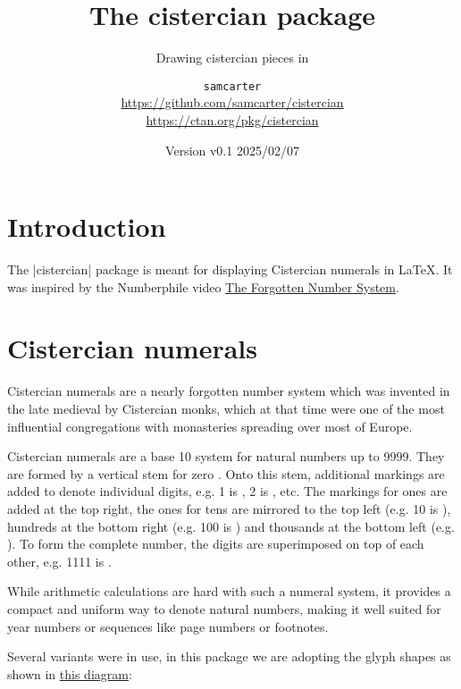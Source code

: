 \documentclass{scrartcl}
\title{The cistercian package}
\subtitle{Drawing cistercian pieces in \TikZ}
\author{%
  \texorpdfstring{
    \texttt{samcarter}\\
    \url{https://github.com/samcarter/cistercian}\\
    \url{https://ctan.org/pkg/cistercian}
  }{samcarter}}
\date{Version v0.1 \textendash{} 2025/02/07}
\begin{document}
\maketitle
\thispagestyle{scrheadings}

\section{Introduction}

The \saminline|cistercian| package is meant for displaying Cistercian numerals in \LaTeX{}.
It was inspired by the Numberphile video \href{https://www.youtube.com/watch?v=9p55Qgt7Ciw}{The Forgotten Number System}. 

\blurb

\section{Cistercian numerals}

Cistercian numerals are a nearly forgotten number system which was invented in the late medieval by Cistercian monks, which at that time were one of the most influential congregations with monasteries spreading over most of Europe.

Cistercian numerals are a base 10 system for natural numbers up to 9999. 
They are formed by a vertical stem for zero .
Onto this stem, additional markings are added to denote individual digits, e.g. 1 is , 2 is , etc. 
The markings for ones are added at the top right, the ones for tens are mirrored to the top left (e.g. 10 is ), hundreds at the bottom right (e.g. 100 is ) and thousands at the bottom left (e.g. ). 
To form the complete number, the digits are superimposed on top of each other, e.g. 1111 is . 

While arithmetic calculations are hard with such a numeral system, it provides a compact and uniform way to denote natural numbers, making it well suited for year numbers or sequences like page numbers or footnotes. 

Several variants were in use, in this package we are adopting the glyph shapes as shown in \href{https://upload.wikimedia.org/wikipedia/commons/6/67/Cistercian_digits_%28vertical%29.svg}{this diagram}:
\end{document}
